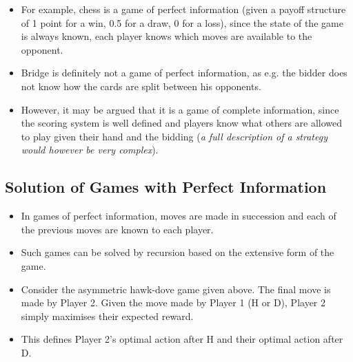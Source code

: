 \documentclass[]{report}
\begin{document}
\begin{itemize}
	\item For example, chess is a game of perfect information (given a payoff
	structure of 1 point for a win, 0.5 for a draw, 0 for a loss), since
	the state of the game is always known, each player knows which
	moves are available to the opponent.
\item Bridge is definitely not a game of perfect information, as e.g. the
	bidder does not know how the cards are split between his
	opponents. 
	\item However, it may be argued that it is a game of
	complete information, since the scoring system is well defined and
	players know what others are allowed to play given their hand and
	the bidding (\textit{a full description of a strategy would however be very
	complex}).
\end{itemize}


\subsection{Solution of Games with Perfect Information}
\begin{itemize}
\item In games of perfect information, moves are made in succession and
each of the previous moves are known to each player.
\item Such games can be solved by recursion based on the extensive
form of the game.
\item Consider the asymmetric hawk-dove game given above. The final
move is made by Player 2. Given the move made by Player 1 (H or
D), Player 2 simply maximises their expected reward.
\item This defines Player 2’s optimal action after H and their optimal
action after D.
\end{itemize}
\end{document}
